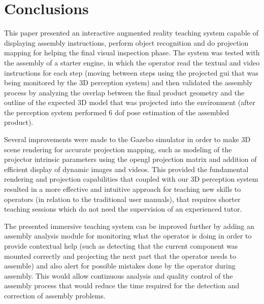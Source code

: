 \section{Conclusions}\label{sec:conclusions}

This paper presented an interactive augmented reality teaching system capable of displaying assembly instructions, perform object recognition and do projection mapping for helping the final visual inspection phase. The system was tested with the assembly of a starter engine, in which the operator read the textual and video instructions for each step (moving between steps using the projected \gls{gui} that was being monitored by the 3D perception system) and then validated the assembly process by analyzing the overlap between the final product geometry and the outline of the expected 3D model that was projected into the environment (after the perception system performed 6 \gls{dof} pose estimation of the assembled product).

Several improvements were made to the Gazebo simulator in order to make 3D scene rendering for accurate projection mapping, such as modeling of the projector intrinsic parameters using the \gls{opengl} projection matrix and addition of efficient display of dynamic images and videos. This provided the fundamental rendering and projection capabilities that coupled with our 3D perception system resulted in a more effective and intuitive approach for teaching new skills to operators (in relation to the traditional user manuals), that requires shorter teaching sessions which do not need the supervision of an experienced tutor.

The presented immersive teaching system can be improved further by adding an assembly analysis module for monitoring what the operator is doing in order to provide contextual help (such as detecting that the current component was mounted correctly and projecting the next part that the operator needs to assemble) and also alert for possible mistakes done by the operator during assembly. This would allow continuous analysis and quality control of the assembly process that would reduce the time required for the detection and correction of assembly problems.
